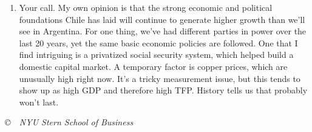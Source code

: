 \documentclass[letterpaper,12pt]{article}
\begin{document}
\begin{enumerate}
\begin{enumerate}
\item Your call.  My own opinion is that the strong economic and political 
foundations Chile has laid will continue to generate higher growth 
than we'll see in Argentina. 
For one thing, we've had different parties in power over the last 20 years, 
yet the same basic economic policies are followed.  
One that I find intriguing is a privatized social security system, 
which helped build a domestic capital market.  
A temporary factor is copper prices, which are unusually high right now. 
It's a tricky measurement issue, but this tends to show up as high GDP 
and therefore high TFP.  
History tells us that probably won't last.

\end{enumerate}

\end{enumerate} 

\vfill \centerline{\it \copyright \ \number\year \  
NYU Stern School of Business}
\end{document}
